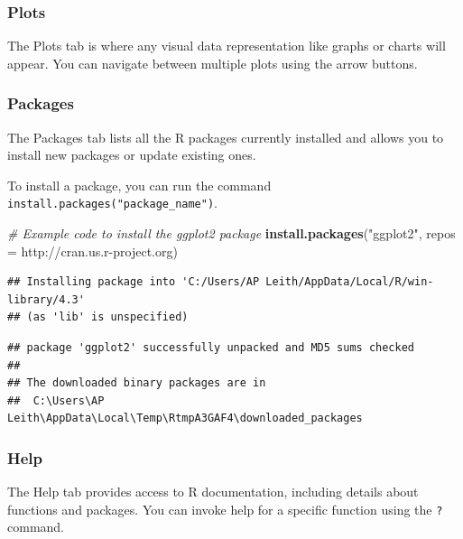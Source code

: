 \documentclass[
  b5paper]{book}
\newenvironment{Shaded}{\begin{snugshade}}{\end{snugshade}}
\newcommand{\AttributeTok}[1]{\textcolor[rgb]{0.13,0.29,0.53}{#1}}
\newcommand{\CommentTok}[1]{\textcolor[rgb]{0.56,0.35,0.01}{\textit{#1}}}
\newcommand{\FunctionTok}[1]{\textcolor[rgb]{0.13,0.29,0.53}{\textbf{#1}}}
\newcommand{\NormalTok}[1]{#1}
\newcommand{\StringTok}[1]{\textcolor[rgb]{0.31,0.60,0.02}{#1}}
\begin{document}
\hypertarget{plots}{%
\subsubsection*{Plots}\label{plots}}

The Plots tab is where any visual data representation like graphs or charts will appear. You can navigate between multiple plots using the arrow buttons.

\hypertarget{packages}{%
\subsubsection*{Packages}\label{packages}}

The Packages tab lists all the R packages currently installed and allows you to install new packages or update existing ones.

To install a package, you can run the command \texttt{install.packages("package\_name")}.

\begin{Shaded}
\begin{Highlighting}[]
\CommentTok{\# Example code to install the \textquotesingle{}ggplot2\textquotesingle{} package }
\FunctionTok{install.packages}\NormalTok{(}\StringTok{"ggplot2"}\NormalTok{, }\AttributeTok{repos =} \StringTok{\textquotesingle{}http://cran.us.r{-}project.org\textquotesingle{}}\NormalTok{)}
\end{Highlighting}
\end{Shaded}

\begin{verbatim}
## Installing package into 'C:/Users/AP Leith/AppData/Local/R/win-library/4.3'
## (as 'lib' is unspecified)
\end{verbatim}

\begin{verbatim}
## package 'ggplot2' successfully unpacked and MD5 sums checked
## 
## The downloaded binary packages are in
##  C:\Users\AP Leith\AppData\Local\Temp\RtmpA3GAF4\downloaded_packages
\end{verbatim}

\hypertarget{help}{%
\subsubsection*{Help}\label{help}}

The Help tab provides access to R documentation, including details about functions and packages. You can invoke help for a specific function using the \texttt{?} command.
\end{document}
